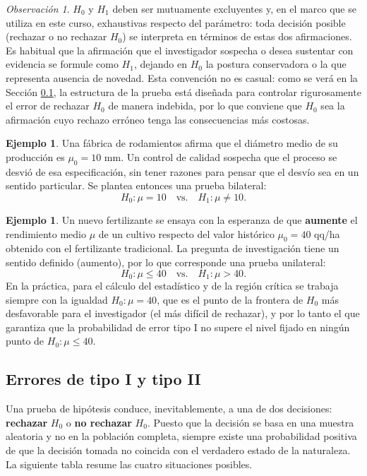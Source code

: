 \documentclass[11pt,a4paper]{article}
\theoremstyle{plain}
\theoremstyle{definition}
\newtheorem{ejemplo}[teorema]{Ejemplo}
\theoremstyle{remark}
\newtheorem{observacion}[teorema]{Observación}
\begin{document}
\begin{observacion}
$H_0$ y $H_1$ deben ser mutuamente excluyentes y, en el marco que se utiliza en este curso, exhaustivas respecto del parámetro: toda decisión posible (rechazar o no rechazar $H_0$) se interpreta en términos de estas dos afirmaciones. Es habitual que la afirmación que el investigador sospecha o desea sustentar con evidencia se formule como $H_1$, dejando en $H_0$ la postura conservadora o la que representa ausencia de novedad. Esta convención no es casual: como se verá en la Sección \ref{sec:errores}, la estructura de la prueba está diseñada para controlar rigurosamente el error de rechazar $H_0$ de manera indebida, por lo que conviene que $H_0$ sea la afirmación cuyo rechazo erróneo tenga las consecuencias más costosas.
\end{observacion}

\begin{ejemplo}
Una fábrica de rodamientos afirma que el diámetro medio de su producción es $\mu_0=10$ mm. Un control de calidad sospecha que el proceso se desvió de esa especificación, sin tener razones para pensar que el desvío sea en un sentido particular. Se plantea entonces una prueba bilateral:
\[
H_0:\mu=10 \quad \text{vs.}\quad H_1:\mu\neq10.
\]
\end{ejemplo}

\begin{ejemplo}
Un nuevo fertilizante se ensaya con la esperanza de que \textbf{aumente} el rendimiento medio $\mu$ de un cultivo respecto del valor histórico $\mu_0=40$ qq/ha obtenido con el fertilizante tradicional. La pregunta de investigación tiene un sentido definido (aumento), por lo que corresponde una prueba unilateral:
\[
H_0:\mu\le40 \quad \text{vs.}\quad H_1:\mu>40.
\]
En la práctica, para el cálculo del estadístico y de la región crítica se trabaja siempre con la igualdad $H_0:\mu=40$, que es el punto de la frontera de $H_0$ más desfavorable para el investigador (el más difícil de rechazar), y por lo tanto el que garantiza que la probabilidad de error tipo I no supere el nivel fijado en ningún punto de $H_0:\mu\le 40$.
\end{ejemplo}

\subsection{Errores de tipo I y tipo II}
\label{sec:errores}

Una prueba de hipótesis conduce, inevitablemente, a una de dos decisiones: \textbf{rechazar} $H_0$ o \textbf{no rechazar} $H_0$. Puesto que la decisión se basa en una muestra aleatoria y no en la población completa, siempre existe una probabilidad positiva de que la decisión tomada no coincida con el verdadero estado de la naturaleza. La siguiente tabla resume las cuatro situaciones posibles.
\end{document}
